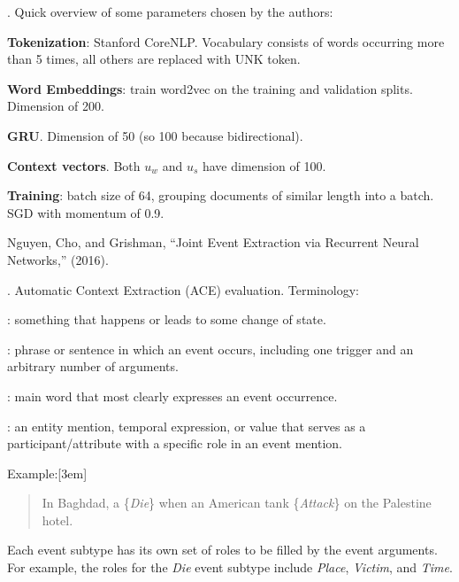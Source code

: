 \documentclass[11pt]{article}
\newcommand\myspace[1][]{\vspace{#1\bigskipamount}}
\newcommand\p{\Needspace{10\baselineskip} \noindent}
\begin{document}
\myspace
\p {}. Quick overview of some parameters chosen by the authors:
\begin{compactitem}
	\item \textbf{Tokenization}: Stanford CoreNLP. Vocabulary consists of words occurring more than 5 times, all others are replaced with UNK token.
	
	\item \textbf{Word Embeddings}: train word2vec on the training and validation splits. Dimension of 200.
	
	\item \textbf{GRU}. Dimension of 50 (so 100 because bidirectional). 
	
	\item \textbf{Context vectors}. Both $u_w$ and $u_s$ have dimension of 100. 
	
	\item \textbf{Training}: batch size of 64, grouping documents of similar length into a batch. SGD with momentum of 0.9.
\end{compactitem}



\vspace{-1em}
{\footnotesize Nguyen, Cho, and Grishman, ``Joint Event Extraction via Recurrent Neural Networks,'' (2016).}

\p {}. Automatic Context Extraction (ACE) evaluation. Terminology:
\begin{compactitem}
	\item {}: something that happens or leads to some change of state.
	\item {}: phrase or sentence in which an event occurs, including one trigger and an arbitrary number of arguments.
	\item {}: main word that most clearly expresses an event occurrence. 
	\item {}: an entity mention, temporal expression, or value that serves as a participant/attribute with a specific role in an event mention.
\end{compactitem}

Example:[3em]
\begin{quote}
	In Baghdad, a  \{\textit{Die}\} when an American tank \{\textit{Attack}\} on the Palestine hotel.
\end{quote}
Each event subtype has its own set of roles to be filled by the event arguments. For example, the roles for the \textit{Die} event subtype include \textit{Place}, \textit{Victim}, and \textit{Time}. 
\end{document}
